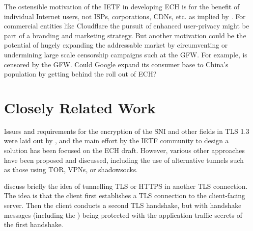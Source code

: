 

The ostensible motivation of the \ac{IETF} in
developing \ac{ECH} is for the benefit of individual Internet users, not \acp{ISP},
corporations, \acp{CDN}, etc. as implied by \cite{rfc8890internet-is-for-end-users}.
For commercial entities like Cloudflare the
pursuit of enhanced user-privacy might be part of
a branding and marketing strategy.
But another motivation could be the potential of
hugely expanding the addressable market by
circumventing or undermining large scale
censorship campaigns such at the \ac{GFW}.
For example,  is censored by the \ac{GFW}.
Could Google expand its consumer base to
China's population by getting behind the roll out of \ac{ECH}?


\section{Closely Related Work}

Issues and requirements for the encryption of the \ac{SNI} and other fields in \ac{TLS} 1.3 were laid out by \cite{rfc8744-issues}, and the main effort by the \ac{IETF} community to design a solution has been focused on the \ac{ECH} draft.
However, various other approaches
have been proposed and discussed,
including the use of alternative tunnels such as those using
TOR, \acp{VPN}, or shadowsocks.

\cite{rfc8744-issues} discuss briefly the idea of tunnelling \ac{TLS} or \ac{HTTPS} in another \ac{TLS} connection. The idea is that the client first establishes a \ac{TLS} connection to the client-facing server. Then the client conducts a second \ac{TLS} handshake, but with handshake messages (including the ) being protected with the application traffic secrets of the first handshake.

